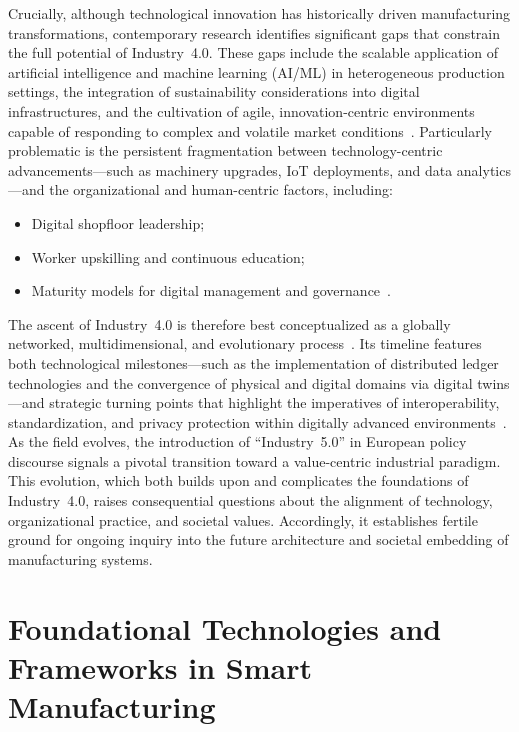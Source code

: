 \documentclass[sigconf]{acmart}
\begin{document}
Crucially, although technological innovation has historically driven manufacturing transformations, contemporary research identifies significant gaps that constrain the full potential of Industry~4.0. These gaps include the scalable application of artificial intelligence and machine learning (AI/ML) in heterogeneous production settings, the integration of sustainability considerations into digital infrastructures, and the cultivation of agile, innovation-centric environments capable of responding to complex and volatile market conditions~\cite{ref41,ref63,ref86}. Particularly problematic is the persistent fragmentation between technology-centric advancements---such as machinery upgrades, IoT deployments, and data analytics---and the organizational and human-centric factors, including:

\begin{itemize}
    \item Digital shopfloor leadership;
    \item Worker upskilling and continuous education;
    \item Maturity models for digital management and governance~\cite{ref92}.
\end{itemize}

The ascent of Industry~4.0 is therefore best conceptualized as a globally networked, multidimensional, and evolutionary process~\cite{ref24}. Its timeline features both technological milestones---such as the implementation of distributed ledger technologies and the convergence of physical and digital domains via digital twins---and strategic turning points that highlight the imperatives of interoperability, standardization, and privacy protection within digitally advanced environments~\cite{ref67,ref91}. As the field evolves, the introduction of ``Industry~5.0'' in European policy discourse signals a pivotal transition toward a value-centric industrial paradigm. This evolution, which both builds upon and complicates the foundations of Industry~4.0, raises consequential questions about the alignment of technology, organizational practice, and societal values. Accordingly, it establishes fertile ground for ongoing inquiry into the future architecture and societal embedding of manufacturing systems.

\section{Foundational Technologies and Frameworks in Smart Manufacturing}
\end{document}
